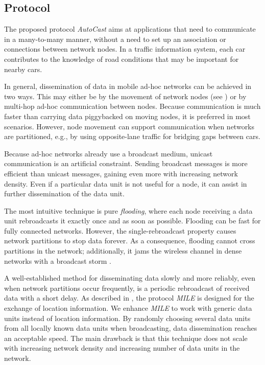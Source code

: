 \documentclass{acmrip}
\begin{document}
\fi

\subsection{Protocol}
\label{sec:protocol}


The proposed protocol \textit{AutoCast} aims at applications
that need to communicate in a many-to-many manner, without a need to
set up an association or connections between network nodes. In a
traffic information system, each car contributes to the knowledge of
road conditions that may be important for nearby cars.

In general, dissemination of data in mobile ad-hoc networks can be
achieved in two ways. This may either be by the movement of network
nodes (see \cite{grid:grossglauser01mobility}) or by multi-hop
ad-hoc communication between nodes. Because communication is much
faster than carrying data piggybacked on moving nodes, it is
preferred in most scenarios. However, node movement can support
communication when networks are partitioned, e.g., by using
opposite-lane traffic for bridging gaps between cars.

Because ad-hoc networks already use a broadcast medium, unicast
communication is an artificial constraint. Sending broadcast
messages is more efficient than unicast messages, gaining even more
with increasing network density. Even if a particular data unit is
not useful for a node, it can assist in further dissemination of the
data unit.


The most intuitive technique is pure \textit{flooding}, where each
node receiving a data unit rebroadcasts it exactly once and as soon
as possible. Flooding can be fast for fully connected networks.
However, the single-rebroadcast property causes network partitions
to stop data forever. As a consequence, flooding cannot cross partitions in the network; additionally, it jams the wireless channel in
dense networks with a broadcast storm \cite{NTC99}.


A well-established method for disseminating data slowly and more
reliably, even when network partitions occur frequently, is a
periodic rebroadcast of received data with a short delay. As
described in \cite{1052873}, the protocol \textit{MILE} is designed
for the exchange of location information. We enhance \textit{MILE}
to work with generic data units instead of location information. By
randomly choosing several data units from all locally known data
units when broadcasting, data dissemination reaches an acceptable
speed. The main drawback is that this technique does not scale with
increasing network density and increasing number of data units in
the network.
\end{document}
